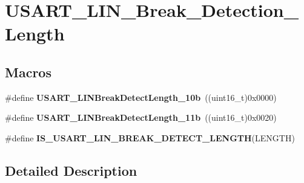 \hypertarget{group___u_s_a_r_t___l_i_n___break___detection___length}{\section{U\-S\-A\-R\-T\-\_\-\-L\-I\-N\-\_\-\-Break\-\_\-\-Detection\-\_\-\-Length}
\label{group___u_s_a_r_t___l_i_n___break___detection___length}
}
\subsection*{Macros}
\begin{DoxyCompactItemize}
\item 
\hypertarget{group___u_s_a_r_t___l_i_n___break___detection___length_gacfd0aabae8774239440e828c961ac2a0}{\#define {\bfseries U\-S\-A\-R\-T\-\_\-\-L\-I\-N\-Break\-Detect\-Length\-\_\-10b}~((uint16\-\_\-t)0x0000)}\label{group___u_s_a_r_t___l_i_n___break___detection___length_gacfd0aabae8774239440e828c961ac2a0}

\item 
\hypertarget{group___u_s_a_r_t___l_i_n___break___detection___length_gaf591cfcc859d67d71e6fa594eb5aec16}{\#define {\bfseries U\-S\-A\-R\-T\-\_\-\-L\-I\-N\-Break\-Detect\-Length\-\_\-11b}~((uint16\-\_\-t)0x0020)}\label{group___u_s_a_r_t___l_i_n___break___detection___length_gaf591cfcc859d67d71e6fa594eb5aec16}

\item 
\#define {\bfseries I\-S\-\_\-\-U\-S\-A\-R\-T\-\_\-\-L\-I\-N\-\_\-\-B\-R\-E\-A\-K\-\_\-\-D\-E\-T\-E\-C\-T\-\_\-\-L\-E\-N\-G\-T\-H}(L\-E\-N\-G\-T\-H)
\end{DoxyCompactItemize}


\subsection{Detailed Description}


